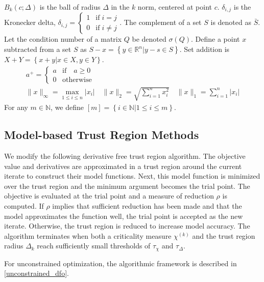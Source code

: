 \documentclass{article}
\theoremstyle{case}
\numberwithin{theorem}{subsection}
\newcommand{\chik}{{\chi^{(k)}}}
\newcommand{\naturals}{\mathbb N}
\newcommand{\Rn}{\mathbb R^n}
\begin{document}
$B_k(c; \Delta)$ is the ball of radius $\Delta$ in the $k$ norm, centered at point $c$.
$\delta_{i,j}$ is the Kronecker delta, $\delta_{i, j} = \begin{cases} 1 & \textrm{if} \; i = j \\ 0 & \textrm{if} \; i \ne j \end{cases}$.
The complement of a set $S$ is denoted as $\bar S$.
Let the condition number of a matrix $Q$ be denoted $\sigma(Q)$.
Define a point $x$ subtracted from a set $S$ as $S - x = \left\{y \in \Rn | y - s \in S\right\}$.
Set addition is $X + Y = \left\{x + y | x \in X, y \in Y\right\}$.
\begin{align*}
a^+ = \begin{cases} a & \textrm{if} \quad a \ge 0 \\ 0 & \textrm{otherwise} \end{cases}\\
\|x\|_{\infty} = \max_{1\le i\le n}|x_i| \quad
\|x\|_{2} = \sqrt{\sum_{i=1}^n x_i^2} \quad
\|x\|_1 = \sum_{i = 1}^n |x_i|
\end{align*}
For any $m \in \naturals$, we define $[m] = \left\{i \in \naturals | 1 \le i \le m\right\}$.

\subsection{Model-based Trust Region Methods}

We modify the following derivative free trust region algorithm.
The objective value and derivatives are approximated in a trust region around the current iterate to construct their model functions.
Next, this model function is minimized over the trust region and the minimum argument becomes the trial point.
The objective is evaluated at the trial point and a measure of reduction $\rho$ is computed.
If $\rho$ implies that sufficient reduction has been made and that the model approximates the function well, the trial point is accepted as the new iterate.
Otherwise, the trust region is reduced to increase model accuracy.
The algorithm terminates when both a criticality measure $\chik$ and the trust region radius $\Delta_k$ reach sufficiently small thresholds of $\tau_{\chi}$ and $\tau_{\Delta}$.


For unconstrained optimization, the algorithmic framework is described in \cref{unconstrained_dfo}.
\end{document}
